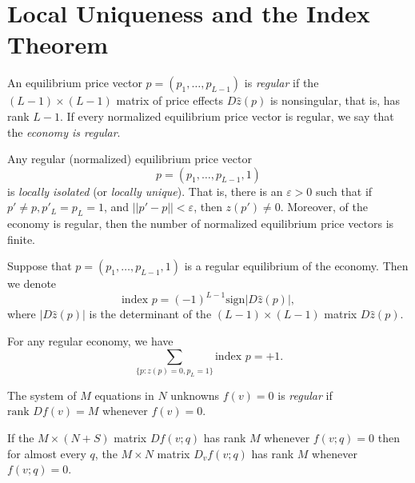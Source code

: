 \section{Local Uniqueness and the Index Theorem}

\begin{defn}
    An equilibrium price vector $p = (p_1, \dots, p_{L - 1})$ is \emph{regular} if the $(L - 1) \times (L - 1)$ matrix of price effects $D \hat{z}(p)$ is nonsingular, that is, has rank $L - 1$. If every normalized equilibrium price vector is regular, we say that the \emph{economy is regular}.
\end{defn}

\begin{prop}
    Any regular (normalized) equilibrium price vector
    \begin{equation*}
        p = (p_1, \dots, p_{L - 1}, 1)
    \end{equation*}
    is \emph{locally isolated} (or \emph{locally unique}). That is, there is an $\varepsilon > 0$ such that if $p' \neq p, p'_L = p_L = 1$, and $||p' - p|| < \varepsilon$, then $z(p') \neq 0$. Moreover, of the economy is regular, then the number of normalized equilibrium price vectors is finite.
\end{prop}

\begin{defn}
    Suppose that $p = (p_1, \dots, p_{L - 1}, 1)$ is a regular equilibrium of the economy. Then we denote
    \begin{equation*}
        \text{index } p = (-1)^{L - 1} \text{sign} |D \hat{z}(p)|,
    \end{equation*}
    where $|D \hat{z}(p)|$ is the determinant of the $(L - 1) \times (L - 1)$ matrix $D \hat{z}(p)$.
\end{defn}

\begin{prop}
    For any regular economy, we have 
    \begin{equation*}
        \sum_{\{p: z(p) = 0, p_L = 1\}} \text{index } p = +1.
    \end{equation*}
\end{prop}

\begin{defn}
    The system of $M$ equations in $N$ unknowns $f(v) = 0$ is \emph{regular} if $\text{rank } Df(v) = M$ whenever $f(v) = 0$.
\end{defn}

\begin{prop}
    If the $M \times (N + S)$ matrix $D f(v; q)$ has rank $M$ whenever $f(v; q) = 0$ then for almost every $q$, the $M \times N$ matrix $D_v f(v; q)$ has rank $M$ whenever $f(v; q) = 0$.
\end{prop}

